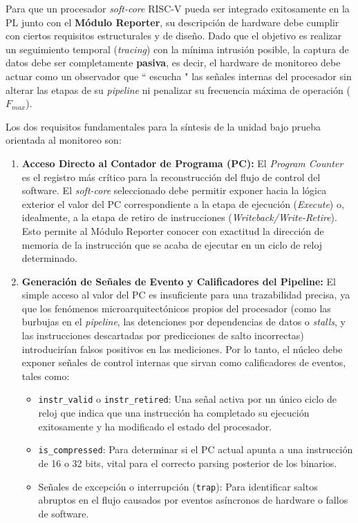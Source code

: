 Para que un procesador \textit{soft-core} RISC-V pueda ser integrado exitosamente en la PL junto con el \textbf{Módulo Reporter}, su descripción de hardware debe cumplir con ciertos requisitos estructurales y de diseño. Dado que el objetivo es realizar un seguimiento temporal (\textit{tracing}) con la mínima intrusión posible, la captura de datos debe ser completamente \textbf{pasiva}, es decir, el hardware de monitoreo debe actuar como un observador que  `` escucha " las señales internas del procesador sin alterar las etapas de su \textit{pipeline} ni penalizar su frecuencia máxima de operación ($F_{max}$).

Los dos requisitos fundamentales para la síntesis de la unidad bajo prueba orientada al monitoreo son:

\begin{enumerate}
    \item \textbf{Acceso Directo al Contador de Programa (PC):} El \textit{Program Counter} es el registro más crítico para la reconstrucción del flujo de control del software. El \textit{soft-core} seleccionado debe permitir exponer hacia la lógica exterior el valor del PC correspondiente a la etapa de ejecución (\textit{Execute}) o, idealmente, a la etapa de retiro de instrucciones (\textit{Writeback/Write-Retire}). Esto permite al Módulo Reporter conocer con exactitud la dirección de memoria de la instrucción que se acaba de ejecutar en un ciclo de reloj determinado.
    
    \item \textbf{Generación de Señales de Evento y Calificadores del Pipeline:} El simple acceso al valor del PC es insuficiente para una trazabilidad precisa, ya que los fenómenos microarquitectónicos propios del procesador (como las burbujas en el \textit{pipeline}, las detenciones por dependencias de datos o \textit{stalls}, y las instrucciones descartadas por predicciones de salto incorrectas) introducirían falsos positivos en las mediciones. Por lo tanto, el núcleo debe exponer señales de control internas que sirvan como calificadores de eventos, tales como:
    \begin{itemize}
        \item \texttt{instr\_valid} o \texttt{instr\_retired}: Una señal activa por un único ciclo de reloj que indica que una instrucción ha completado su ejecución exitosamente y ha modificado el estado del procesador.
        \item \texttt{is\_compressed}: Para determinar si el PC actual apunta a una instrucción de 16 o 32 bits, vital para el correcto parsing posterior de los binarios.
        \item Señales de excepción o interrupción (\texttt{trap}): Para identificar saltos abruptos en el flujo causados por eventos asíncronos de hardware o fallos de software.
    \end{itemize}
\end{enumerate}

